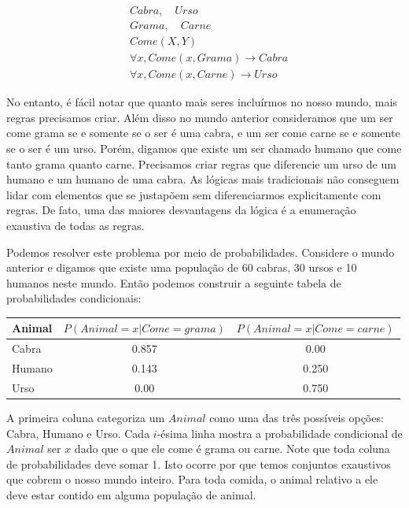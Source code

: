 \documentclass[a4paper,10pt]{article}
\theoremstyle{plain}
\begin{document}
\begin{align*}
  &Cabra, \quad Urso \\
  &Grama, \quad Carne \\
  &Come(X, Y) \\
  &\forall x, Come(x, Grama) \to Cabra \\
  &\forall x, Come(x, Carne) \to Urso
\end{align*}

No entanto, é fácil notar que quanto mais seres incluírmos no nosso mundo, mais regras precisamos
criar. Além disso no mundo anterior consideramos que um ser come grama se e somente se o ser é uma
cabra, e um ser come carne se e somente se o ser é um urso. Porém, digamos que existe um ser
chamado humano que come tanto grama quanto carne. Precisamos criar regras que diferencie um urso de
um humano e um humano de uma cabra. As lógicas mais tradicionais não conseguem lidar com elementos
que se justapõem sem diferenciarmos explicitamente com regras. De fato, uma das maiores
desvantagens da lógica é a enumeração exaustiva de todas as regras.

Podemos resolver este problema por meio de probabilidades. Considere o mundo anterior e digamos que
existe uma população de 60 cabras, 30 ursos e 10 humanos neste mundo. Então podemos construir a
seguinte tabela de probabilidades condicionais:

\begin{table}[h]
  \begin{center}
    \begin{tabular}{l | c  c}
      Animal & $P(Animal=x | Come=grama)$ & $P(Animal=x | Come=carne)$ \\
      \hline
      Cabra & 0.857 & 0.00 \\
      Humano & 0.143 & 0.250 \\
      Urso & 0.00 & 0.750 \\
    \end{tabular}
  \end{center}
\end{table}

A primeira coluna categoriza um $Animal$ como uma das três possíveis opções: Cabra, Humano e Urso.
Cada $i$-ésima linha mostra a probabilidade condicional de $Animal$ ser $x$ dado que o que ele come
é grama ou carne. Note que toda coluna de probabilidades deve somar 1. Isto ocorre por que
temos conjuntos exaustivos que cobrem o nosso mundo inteiro. Para toda comida, o animal relativo
a ele deve estar contido em alguma população de animal.
\end{document}
